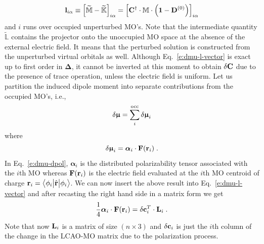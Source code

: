 \documentclass[aip,amsmath,amssymb,reprint,floatfix]{revtex4-1}
\newcommand{\tbraket}[3]{\ensuremath{\bigl\langle {#1} \bigl\lvert {#2} \bigl\lvert {#3} \bigr\rangle}}
\newcommand{\BM}[1]{\bm{#1}}
\begin{document}
%
\begin{equation}\label{e:l-vector}
 {\bf l}_{i\alpha} \equiv \left[ \widetilde{\mathbb{M}} - \widetilde{\mathbb{K}} \right]_{i\alpha} 
      = \left[  {\bf C}^\dagger \cdot \mathbb{M} \cdot \left( {\bf 1} - {\bf D}^{(0)} \right) \right]_{i\alpha}
\end{equation}
%
and $i$ runs over occupied unperturbed MO's.
Note that the intermediate quantity $\widetilde{\mathbb{L}}$ contains the projector onto
the unoccupied MO space at the absence of the external electric field. It means that the
perturbed solution is constructed from the unperturbed virtual orbitals as well.
Although Eq.~\eqref{e:dmu-l-vector}
is exact up to first order in ${\BM\Delta}$, it cannot be inverted at this moment to obtain $\delta {\bf C}$
due to the presence of trace operation, unless the electric field is uniform.
Let us partition the induced dipole moment into separate contributions
from the occupied MO's, i.e.,
%
\begin{equation} \label{e:dmu-part}
 \delta {\BM{\upmu}} = \sum_i^{\rm occ} \delta {\BM{\upmu}}_i
\end{equation}
%
where
%
\begin{equation} \label{e:dmu-dpol}
 \delta {\BM{\upmu}}_i = {\BM{\alpha}}_i \cdot {\bf F}({\bf r}_i) \;.
\end{equation}
%
In Eq.~\eqref{e:dmu-dpol}, ${\BM{\alpha}}_i$ is the distributed polarizability tensor
associated with the $i$th MO whereas ${\bf F}({\bf r}_i)$ is the electric field evaluated at the $i$th MO centroid of charge
${\bf r}_i = \tbraket{\phi_i}{\hat{\bf r}}{\phi_i}$.
We can now insert the above result into Eq.~\eqref{e:dmu-l-vector} 
and after recasting the right hand side in a matrix form
we get
%
\begin{equation} \label{e:dmu-l-vector-mo-transform-X}
 \frac{1}{4} {\BM{\alpha}}_i \cdot {\bf F}({\bf r}_i) 
   =
   \delta {\bf c}_i^T \cdot {\bf L}_i \;.
\end{equation}
%
Note that now ${\bf L}_i$ is a matrix of size $(n \times 3)$ and $\delta{\bf c}_i$ is just the $i$th column of the
change in the LCAO-MO matrix due to the polarization process.
%
\end{document}
